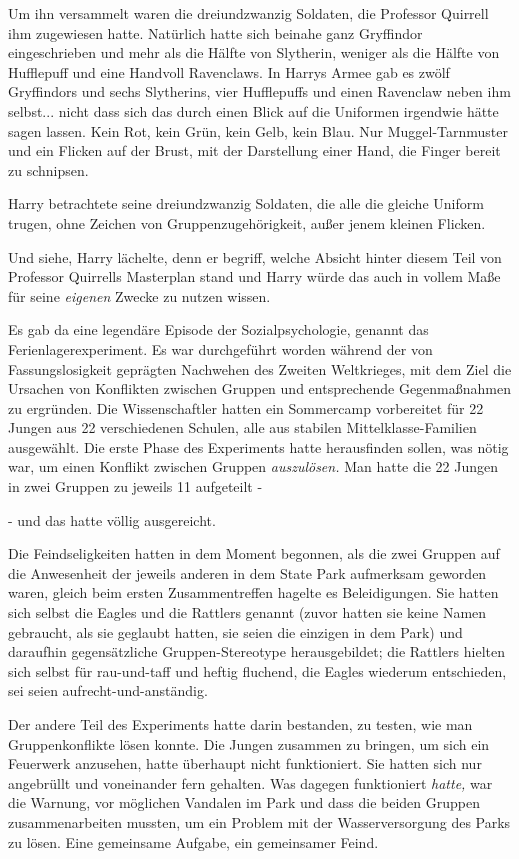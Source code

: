 {Um ihn versammelt waren die dreiundzwanzig Soldaten, die Professor Quirrell ihm zugewiesen hatte. Natürlich hatte sich beinahe ganz Gryffindor eingeschrieben und mehr als die Hälfte von Slytherin, weniger als die Hälfte von Hufflepuff und eine Handvoll Ravenclaws. In Harrys Armee gab es zwölf Gryffindors und sechs Slytherins, vier Hufflepuffs und einen Ravenclaw neben ihm selbst... nicht dass sich das durch einen Blick auf die Uniformen irgendwie hätte sagen lassen. Kein Rot, kein Grün, kein Gelb, kein Blau. Nur Muggel-Tarnmuster und ein Flicken auf der Brust, mit der Darstellung einer Hand, die Finger bereit zu schnipsen.

Harry betrachtete seine dreiundzwanzig Soldaten, die alle die gleiche Uniform trugen, ohne Zeichen von Gruppenzugehörigkeit, außer jenem kleinen Flicken.

Und siehe, Harry lächelte, denn er begriff, welche Absicht hinter diesem Teil von Professor Quirrells Masterplan stand und Harry würde das auch in vollem Maße für seine \emph{eigenen} Zwecke zu nutzen wissen.

Es gab da eine legendäre Episode der Sozialpsychologie, genannt das Ferienlagerexperiment. Es war durchgeführt worden während der von Fassungslosigkeit geprägten Nachwehen des Zweiten Weltkrieges, mit dem Ziel die Ursachen von Konflikten zwischen Gruppen und entsprechende Gegenmaßnahmen zu ergründen. Die Wissenschaftler hatten ein Sommercamp vorbereitet für 22 Jungen aus 22 verschiedenen Schulen, alle aus stabilen Mittelklasse-Familien ausgewählt. Die erste Phase des Experiments hatte herausfinden sollen, was nötig war, um einen Konflikt zwischen Gruppen \emph{auszulösen.} Man hatte die 22 Jungen in zwei Gruppen zu jeweils 11 aufgeteilt -

- und das hatte völlig ausgereicht.

Die Feindseligkeiten hatten in dem Moment begonnen, als die zwei Gruppen auf die Anwesenheit der jeweils anderen in dem State Park aufmerksam geworden waren, gleich beim ersten Zusammentreffen hagelte es Beleidigungen. Sie hatten sich selbst die Eagles und die Rattlers genannt (zuvor hatten sie keine Namen gebraucht, als sie geglaubt hatten, sie seien die einzigen in dem Park) und daraufhin gegensätzliche Gruppen-Stereotype herausgebildet; die Rattlers hielten sich selbst für rau-und-taff und heftig fluchend, die Eagles wiederum entschieden, sei seien aufrecht-und-anständig.

Der andere Teil des Experiments hatte darin bestanden, zu testen, wie man Gruppenkonflikte lösen konnte. Die Jungen zusammen zu bringen, um sich ein Feuerwerk anzusehen, hatte überhaupt nicht funktioniert. Sie hatten sich nur angebrüllt und voneinander fern gehalten. Was dagegen funktioniert \emph{hatte,} war die Warnung, vor möglichen Vandalen im Park und dass die beiden Gruppen zusammenarbeiten mussten, um ein Problem mit der Wasserversorgung des Parks zu lösen. Eine gemeinsame Aufgabe, ein gemeinsamer Feind.

}
